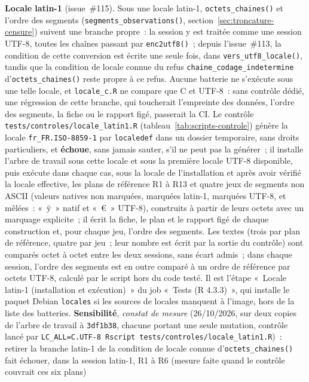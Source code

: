 \documentclass[a4paper,11pt]{article}
\newcommand{\code}[1]{\texttt{\small #1}}
\begin{document}
\medskip
\noindent
\textbf{Locale latin-1} (issue~\#115). Sous une locale latin-1,
\code{octets\_chaines()} et l'ordre des segments
(\code{segments\_observations()}, section~\ref{sec:troncature-censure})
suivent une branche propre~: la session y est traitée comme une session
UTF-8, toutes les chaînes passant par \code{enc2utf8()}~; depuis
l'issue~\#113, la condition de cette conversion est écrite une seule fois,
dans \code{vers\_utf8\_locale()}, tandis que la condition de locale connue
du refus \code{chaine\_codage\_indetermine} d'\code{octets\_chaines()}
reste propre à ce refus. Aucune batterie ne
s'exécute sous une telle locale, et \code{locale\_c.R} ne compare que C et
UTF-8~: sans contrôle dédié, une régression de cette branche, qui
toucherait l'empreinte des données, l'ordre des segments, la fiche ou le
rapport figé, passerait la CI. Le contrôle
\code{tests/controles/locale\_latin1.R} (tableau~\ref{tab:scripts-controle})
génère la locale \code{fr\_FR.ISO-8859-1} par \code{localedef} dans un
dossier temporaire, sans droits particuliers, et \textbf{échoue}, sans
jamais sauter, s'il ne peut pas la générer~; il installe l'arbre de travail
sous cette locale et sous la première locale UTF-8 disponible, puis
exécute dans chaque cas, sous la locale de l'installation et après avoir
vérifié la locale effective, les plans de référence R1 à R13 et quatre jeux
de segments non ASCII (valeurs natives non marquées, marquées latin-1,
marquées UTF-8, et mêlées~: «~ÿ~» natif et «~€~» UTF-8), construits à
partir de leurs octets avec un marquage explicite~; il écrit la fiche, le
plan et le rapport figé de chaque construction et, pour chaque jeu, l'ordre
des segments. Les textes (trois par plan de référence, quatre par jeu~;
leur nombre est écrit par la sortie du contrôle) sont comparés octet à octet entre les deux sessions, sans écart admis~; dans
chaque session, l'ordre des segments est en outre comparé à un ordre de
référence par octets UTF-8, calculé par le script hors du code testé. Il est
l'étape «~Locale latin-1 (installation et exécution)~» du job «~Tests
(R 4.3.3)~», qui installe le paquet Debian \code{locales} si les sources de
locales manquent à l'image, hors de la liste des batteries.
\textbf{Sensibilité}, \emph{constat de mesure} (26/10/2026, sur deux
copies de l'arbre de travail à \code{3df1b38}, chacune portant une seule
mutation, contrôle lancé par
\code{LC\_ALL=C.UTF-8 Rscript tests/controles/locale\_latin1.R})~:
retirer la branche latin-1 de la condition de locale connue
d'\code{octets\_chaines()} fait échouer, dans la session latin-1, R1 à R6
(mesure faite quand le contrôle couvrait ces six plans)
\end{document}
